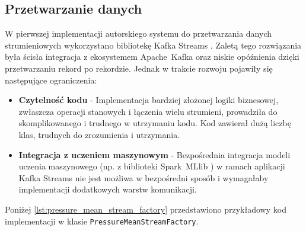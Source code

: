 \subsection{Przetwarzanie danych}

W pierwszej implementacji autorskiego systemu do przetwarzania danych strumieniowych wykorzystano bibliotekę Kafka Streams \cite{kafka_streams}. Zaletą tego rozwiązania była ścisła integracja z ekosystemem \mbox{Apache Kafka} \cite{kafka} oraz niskie opóźnienia dzięki przetwarzaniu rekord po rekordzie. Jednak w trakcie rozwoju pojawiły się następujące ograniczenia:
\begin{itemize}
    \item \textbf{Czytelność kodu} - Implementacja bardziej złożonej logiki biznesowej, zwłaszcza operacji stanowych i łączenia wielu strumieni, prowadziła do skomplikowanego i trudnego w utrzymaniu kodu. Kod zawierał dużą liczbę klas, trudnych do zrozumienia i utrzymania.
    \item \textbf{Integracja z uczeniem maszynowym} - Bezpośrednia integracja modeli uczenia maszynowego (np. z biblioteki \mbox{Spark MLlib} \cite{spark_mllib_reference}) w ramach aplikacji Kafka Streams nie jest możliwa w bezpośredni sposób i wymagałaby implementacji dodatkowych warstw komunikacji.
\end{itemize}

Poniżej \ref{lst:pressure_mean_stream_factory} przedstawiono przykładowy kod implementacji w klasie \texttt{PressureMeanStreamFactory}.


